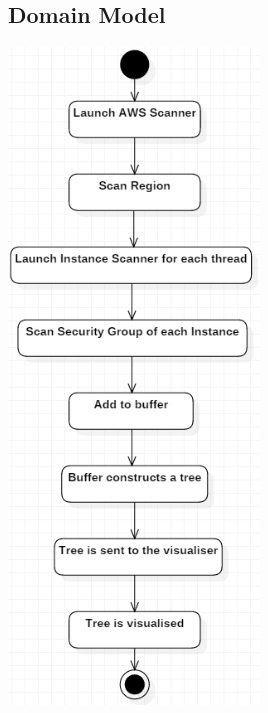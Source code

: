 \documentclass[a4paper,12pt]{report}
\begin{document}
\subsection{Domain Model}
	\begin{center}
  	  	\includegraphics[width=0.5\textwidth] {./Diagrams/ScanInstancesSequence.png}\\[0.4cm]    
	\end{center}
\end{document}
